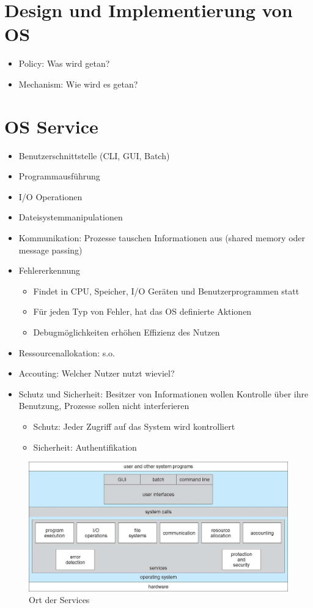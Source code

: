 \documentclass[a4paper]{scrreprt}
\begin{document}
\section{Design und Implementierung von OS}
\begin{itemize}
	\item Policy: Was wird getan?
	\item Mechanism: Wie wird es getan?
\end{itemize}

\section{OS Service}
\begin{itemize}
	\item Benutzerschnittstelle (CLI, GUI, Batch)
	\item Programmausführung
	\item I/O Operationen
	\item Dateisystemmanipulationen
	\item Kommunikation: Prozesse tauschen Informationen aus (shared memory oder message passing)
	\item Fehlererkennung
		\begin{itemize}
			\item Findet in CPU, Speicher, I/O Geräten und Benutzerprogrammen statt
			\item Für jeden Typ von Fehler, hat das OS definierte Aktionen
			\item Debugmöglichkeiten erhöhen Effizienz des Nutzen
		\end{itemize}
	\item Ressourcenallokation: s.o.
	\item Accouting: Welcher Nutzer nutzt wieviel?
	\item Schutz und Sicherheit: Besitzer von Informationen wollen Kontrolle über ihre Benutzung, Prozesse sollen nicht interferieren
		\begin{itemize}
			\item Schutz: Jeder Zugriff auf das System wird kontrolliert
			\item Sicherheit: Authentifikation
		\end{itemize}
\end{itemize}

\begin{figure}[ht]
\centering
\includegraphics[scale=0.35]{graphics/services.png}
\caption{Ort der Services}
\end{figure}
\end{document}
